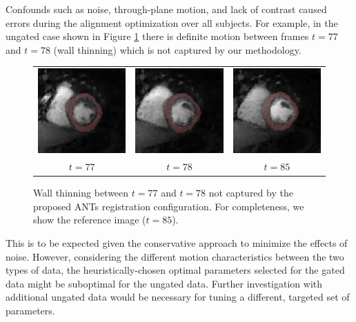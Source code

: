 \documentclass{llncs}
\begin{document}
Confounds such as noise, through-plane motion, and lack of contrast caused errors 
during the alignment optimization over all subjects.  For example,
in the ungated case shown in Figure \ref{fig:moco_ungated} there is
definite motion between frames $t = 77$ and $t = 78$ (wall thinning)
which is not captured by our methodology.
\begin{figure}
  \centering
  \begin{tabular}{ccc}
    \includegraphics[width=40mm]{Figures/MoCo_Ungated_slice77.png} &
    \includegraphics[width=40mm]{Figures/MoCo_Ungated_slice78.png} &
    \includegraphics[width=40mm]{Figures/MoCo_Ungated_slice85.png} \\
    $t = 77$ & $t = 78$ & $t = 85$ \\
  \end{tabular}
  \caption{Wall thinning between $t = 77$ and $t = 78$ not captured by 
           the proposed ANTs registration configuration.  For completeness,
           we show the reference image ($t=85$).
          }
  \label{fig:moco_ungated}
\end{figure}
This is to be expected given the conservative approach to
minimize the effects of noise.  
However, considering the different motion characteristics between the two
types of data, the heuristically-chosen optimal parameters selected for the
gated data might be suboptimal for the ungated data.  Further investigation with 
additional ungated data would be necessary for tuning a different, targeted set
of parameters.
\end{document}

